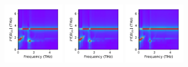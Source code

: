 \documentclass[a4paper]{article}
\begin{document}
\begin{figure}[H]
  \centering
  \includegraphics[width=0.23\textwidth]{cond_w_pcolor-A2-v0-imp0.pdf}
  \includegraphics[width=0.23\textwidth]{cond_w_pcolor-A2-v1-imp0.pdf}
  \includegraphics[width=0.23\textwidth]{cond_w_pcolor-A2-v2-imp0.pdf}
\end{figure}
\end{document}
